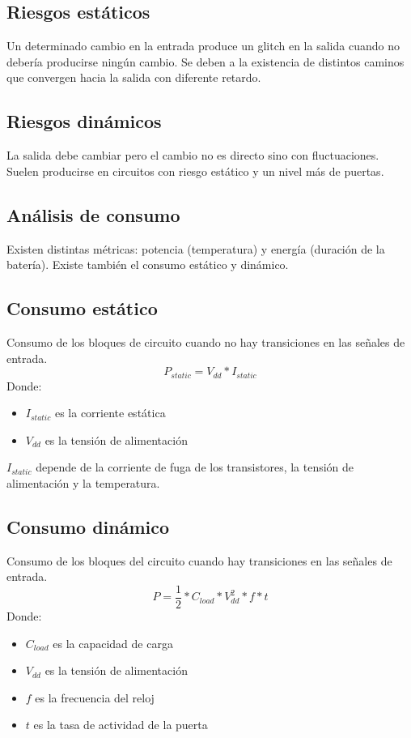 \subsection{Riesgos estáticos}
Un determinado cambio en la entrada produce un glitch en la salida cuando no debería producirse ningún cambio. Se deben a la existencia de distintos caminos que convergen hacia la salida con diferente retardo.

\subsection{Riesgos dinámicos}
La salida debe cambiar pero el cambio no es directo sino con fluctuaciones. Suelen producirse en circuitos con riesgo estático y un nivel más de puertas.

\subsection{Análisis de consumo}
Existen distintas métricas: potencia (temperatura) y  energía (duración de la batería).
Existe también el consumo estático y dinámico.

\subsection{Consumo estático}
Consumo de los bloques de circuito cuando no hay transiciones en las señales de entrada.
\[
    P_{static} = V_{dd} * I_{static}
\]
Donde:
\begin{itemize}
    \item $I_{static}$ es la corriente estática
    \item $V_{dd}$ es la tensión de alimentación
\end{itemize}

$I_{static}$ depende de la corriente de fuga de los transistores, la tensión de alimentación y la temperatura.

\subsection{Consumo dinámico}
Consumo de los bloques del circuito cuando hay transiciones en las señales de entrada.
\[
    P = \frac{1}{2}*C_{load}*V_{dd}^{2} * f * t
\]
Donde:
\begin{itemize}
    \item $C_{load}$ es la capacidad de carga
    \item $V_{dd}$ es la tensión de alimentación
    \item $f$ es la frecuencia del reloj
    \item $t$ es la tasa de actividad de la puerta
\end{itemize}

